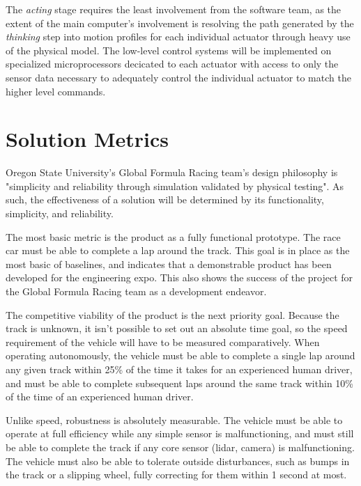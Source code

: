 \documentclass[10pt,draftclsnofoot,onecolumn]{article}
\begin{document}
The \textit{acting} stage requires the least involvement from the software team, as the extent of the main computer's involvement is resolving the path generated by the \textit{thinking} step into motion profiles for each individual actuator through heavy use of the physical model. The low-level control systems will be implemented on specialized microprocessors decicated to each actuator with access to only the sensor data necessary to adequately control the individual actuator to match the higher level commands.

\section{Solution Metrics}
Oregon State University's Global Formula Racing team's design philosophy is "simplicity and reliability through simulation validated by physical testing". As such, the effectiveness of a solution will be determined by its functionality, simplicity, and reliability.

The most basic metric is the product as a fully functional prototype. The race car must be able to complete a lap around the track. This goal is in place as the most basic of baselines, and indicates that a demonstrable product has been developed for the engineering expo. This also shows the success of the project for the Global Formula Racing team as a development endeavor.

The competitive viability of the product is the next priority goal. Because the track is unknown, it isn't possible to set out an absolute time goal, so the speed requirement of the vehicle will have to be measured comparatively. When operating autonomously, the vehicle must be able to complete a single lap around any given track within 25\% of the time it takes for an experienced human driver, and must be able to complete subsequent laps around the same track within 10\% of the time of an experienced human driver.

Unlike speed, robustness is absolutely measurable. The vehicle must be able to operate at full efficiency while any simple sensor is malfunctioning, and must still be able to complete the track if any core sensor (lidar, camera) is malfunctioning. The vehicle must also be able to tolerate outside disturbances, such as bumps in the track or a slipping wheel, fully correcting for them within 1 second at most.

\nocite{*}

\end{document}
